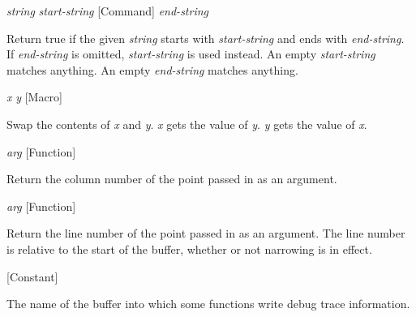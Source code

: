 \vspace{1em}
\noindent
{}
\usebox{\funcname}\emph{string} \emph{start-string}
 \hfill [Command]
\hspace*{\wd\funcname}\emph{end-string}

\begin{doc-string}
Return true if the given \emph{string} starts with \emph{start-string} and ends with
\emph{end-string}.  If \emph{end-string} is omitted, \emph{start-string} is used instead.
An empty \emph{start-string} matches anything.  An empty \emph{end-string} matches anything.
\end{doc-string}

\vspace{1em}
\noindent
{}
\usebox{\funcname}\emph{x} \emph{y}
 \hfill [Macro]

\begin{doc-string}
Swap the contents of \emph{x} and \emph{y}.  \emph{x} gets the value of \emph{y}.  \emph{y} gets the value of \emph{x}.
\end{doc-string}

\vspace{1em}
\noindent
{}
\usebox{\funcname}\emph{arg}
 \hfill [Function]

\begin{doc-string}
Return the column number of the point passed in as an argument.
\end{doc-string}

\vspace{1em}
\noindent
{}
\usebox{\funcname}\emph{arg}
 \hfill [Function]

\begin{doc-string}
Return the line number of the point passed in as an argument.  The line number is
relative to the start of the buffer, whether or not narrowing is in effect.
\end{doc-string}

\vspace{1em}
\noindent
{}
\usebox{\funcname}
 \hfill [Constant]

\begin{doc-string}
The name of the buffer into which some functions write debug trace
information.
\end{doc-string}

